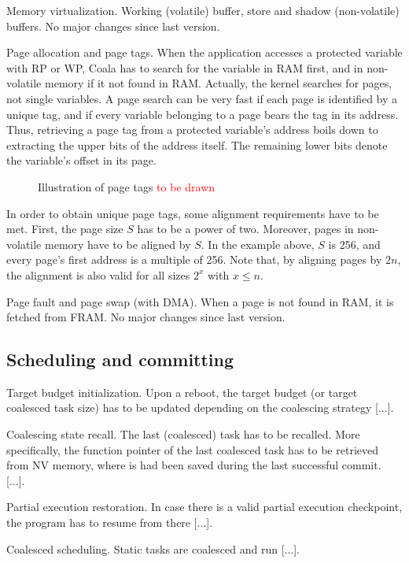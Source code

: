 Memory virtualization. Working (volatile) buffer, store and shadow (non-volatile) buffers. No major changes since last version.

Page allocation and page tags. When the application accesses a protected variable with RP or WP, Coala has to search for the variable in RAM first, and in non-volatile memory if it not found in RAM. Actually, the kernel searches for pages, not single variables. A page search can be very fast if each page is identified by a unique tag, and if every variable belonging to a page bears the tag in its address. Thus, retrieving a page tag from a protected variable’s address boils down to extracting the upper bits of the address itself. The remaining lower bits denote the variable’s offset in its page.

\begin{figure}
	\caption{Illustration of page tags \textcolor{red}{to be drawn}}
\end{figure}

In order to obtain unique page tags, some alignment requirements have to be met. First, the page size $S$ has to be a power of two. Moreover, pages in non-volatile memory have to be aligned by $S$. In the example above, $S$ is 256, and every page’s first address is a multiple of 256. Note that, by aligning pages by $2n$, the alignment is also valid for all sizes $2^x$ with $x \leq n$.

Page fault and page swap (with DMA). When a page is not found in RAM, it is fetched from FRAM. No major changes since last version.

\subsection{Scheduling and committing}

Target budget initialization. Upon a reboot, the target budget (or target coalesced task size) has to be updated depending on the coalescing strategy [...].

Coalescing state recall. The last (coalesced) task has to be recalled. More specifically, the function pointer of the last coalesced task has to be retrieved from NV memory, where is had been saved during the last successful commit. [...].

Partial execution restoration. In case there is a valid partial execution checkpoint, the program has to resume from there [...].

Coalesced scheduling. Static tasks are coalesced and run [...].

